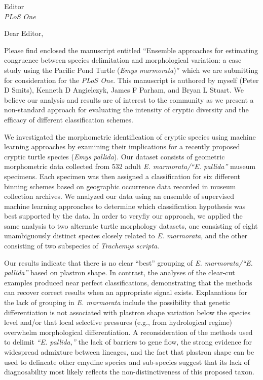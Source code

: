 \documentclass{letter}
\begin{document}
\begin{letter}{Editor \\ \textit{PLoS One}}
  \opening{Dear Editor,}

  Please find enclosed the manuscript entitled ``Ensemble approaches for estimating congruence between species delimitation and morphological variation: a case study using the Pacific Pond Turtle (\textit{Emys marmorata})'' which we are submitting for consideration for the \textit{PLoS One}. This manuscript is authored by myself (Peter D Smits), Kenneth D Angielczyk, James F Parham, and Bryan L Stuart. We believe our analysis and results are of interest to the community as we present a non-standard approach for evaluating the intensity of cryptic diversity and the efficacy of different classification schemes.

  We investigated the morphometric identification of cryptic species using machine learning approaches by examining their implications for a recently proposed cryptic turtle species (\textit{Emys pallida}). Our dataset consists of geometric morphometric data collected from  532 adult \textit{E. marmorata/``E. pallida''} museum specimens. Each specimen was then assigned a classification for six different binning schemes based on geographic occurrence data recorded in museum collection archives. We analyzed our data using an ensemble of supervised machine learning approaches to determine which classification hypothesis was best supported by the data. In order to veryfiy our approach, we applied the same analysis to two alternate turtle morphology datasets, one consisting of eight unambiguously distinct species closely related to \textit{E. marmorata}, and the other consisting of two subspecies of \textit{Trachemys scripta}. 
  
  Our results indicate that there is no clear ``best'' grouping of \textit{E. marmorata/``E. pallida''} based on plastron shape. In contrast, the analyses of the clear-cut examples produced near perfect classifications, demonstrating that the methods can recover correct results when an appropriate signal exists. Explanations for the lack of grouping in \textit{E. marmorata} include the possibility that genetic differentiation is not associated with plastron shape variation below the species level and/or that local selective pressures (e.g., from hydrological regime) overwhelm morphological differentiation. A reconsideration of the methods used to delimit \textit{``E. pallida,''} the lack of barriers to gene flow, the strong evidence for widespread admixture between lineages, and the fact that plastron shape can be used to delineate other emydine species and sub-species suggest that its lack of diagnosability most likely reflects the non-distinctiveness of this proposed taxon. 


\end{letter}
\end{document}
